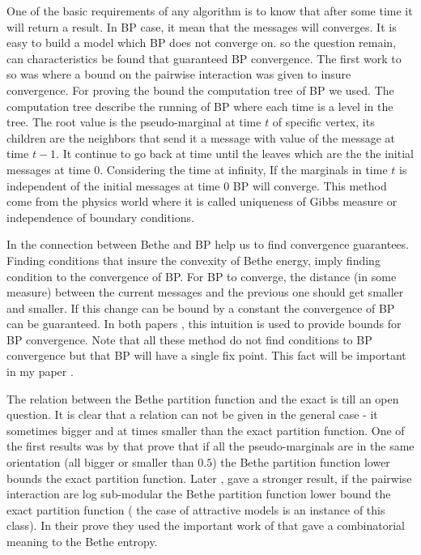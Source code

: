 One of the basic requirements of any algorithm is to know that after some time it will return a result.
In BP case, it mean that the messages will converges.
It is easy to build a model which BP does not converge on.
so the question remain, can characteristics be found that guaranteed BP convergence.
The first work to so was \cite{tatikonda2002loopy} where a bound on the pairwise interaction was given to insure convergence.
For proving the bound the computation tree of BP we used.
The computation tree describe the running of BP where each time is a level in the tree.
The root value is the pseudo-marginal at time $t$ of specific vertex, its children are the neighbors that  send it a message with value of the message at time $t-1$.
It continue to go back at time until the leaves which are the  the initial messages at time $0$.
Considering the time at infinity, If the marginals in time $t$ is independent of the initial messages at time $0$ BP will converge.
This method come from the physics world where it is called uniqueness of Gibbs measure or independence of boundary conditions.

In \cite{heskes2004uniqueness} the connection between Bethe and BP help us to find convergence guarantees.
Finding conditions that insure the convexity of Bethe energy, imply finding condition to the convergence of BP. 
For BP to converge,  the distance (in some measure) between the current messages and the previous one should get smaller and smaller.
If this change can be bound by a constant the convergence of BP can be guaranteed.
In both papers \cite{mooij2007sufficient}, \cite{roosta2008convergence} this intuition is used to provide bounds for BP convergence.
Note that all these method do not find conditions to BP convergence but that BP will have a single fix point.
This fact will be important in my paper \cite{heinemann2012cannot}.

The relation between the Bethe partition function and the exact is till an open question.
It is clear that a relation can not be given in the general case - it sometimes bigger and at times smaller than the exact partition function.
One of the first results was by \cite{AlanNips2007} that prove that if all the pseudo-marginals are in the same orientation (all bigger or smaller than $0.5$) the Bethe partition function lower bounds the exact partition function.
Later \cite{RuozziNips2012},  gave a stronger result, if the pairwise interaction are log sub-modular the Bethe partition function lower bound the exact partition function ( the case of attractive models is an instance of this class).
In their prove they used the important work of \cite{vontobel2013counting} that gave a combinatorial meaning to the Bethe entropy.

